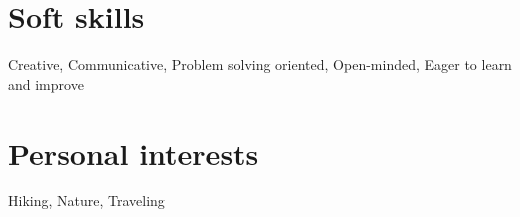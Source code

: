 \documentclass[letterpaper,11pt]{article}
\begin{document}
\section{{Soft skills}}
 \begin{itemize}[leftmargin=0.15in, label={}]
    \small{\item Creative, Communicative, Problem solving oriented, Open-minded, Eager to learn and improve}
 \end{itemize}

\section{{Personal interests}}
 \begin{itemize}[leftmargin=0.15in, label={}]
    \small{\item Hiking, Nature, Traveling}
 \end{itemize}
\end{document}
